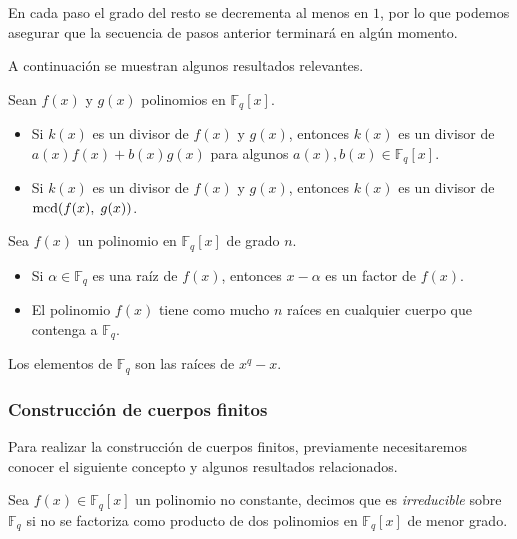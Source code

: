 En cada paso el grado del resto se decrementa al menos en $1$, por lo que podemos asegurar que la secuencia de pasos anterior terminará en algún momento.

A continuación se muestran algunos resultados relevantes.

\begin{proposition}
    Sean $f(x)$ y $g(x)$ polinomios en $\mathbb{F}_q[x]$.
    \begin{itemize}
        \item Si $k(x)$ es un divisor de $f(x)$ y $g(x)$, entonces $k(x)$ es un divisor de $a(x) f(x) + b(x) g(x)$ para algunos $a(x), b(x) \in \mathbb{F}_q[x]$.
        \item Si $k(x)$ es un divisor de $f(x)$ y $g(x)$, entonces $k(x)$ es un divisor de $\operatorname{mcd}(f(x), \; g(x))$.
    \end{itemize}
\end{proposition}

\begin{proposition}
    Sea $f(x)$ un polinomio en $\mathbb{F}_q[x]$ de grado $n$.
    \begin{itemize}
        \item Si $\alpha \in \mathbb{F}_q$ es una raíz de $f(x)$, entonces $x - \alpha$ es un factor de $f(x)$.
        \item El polinomio $f(x)$ tiene como mucho $n$ raíces en cualquier cuerpo que contenga a $\mathbb{F}_q$.
    \end{itemize}
\end{proposition}

\begin{theorem}
    Los elementos de $\mathbb{F}_q$ son las raíces de $x^q - x$.
\end{theorem}

\subsubsection{Construcción de cuerpos finitos}

Para realizar la construcción de cuerpos finitos, previamente necesitaremos conocer el siguiente concepto y algunos resultados relacionados.

\begin{definition}
    Sea $f(x) \in \mathbb{F}_q[x]$ un polinomio no constante, decimos que es \emph{irreducible} sobre $\mathbb{F}_q$ si no se factoriza como producto de dos polinomios en $\mathbb{F}_q[x]$ de menor grado.
\end{definition}

